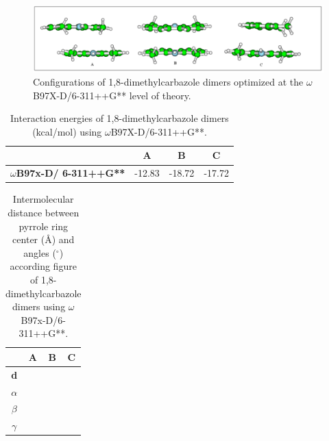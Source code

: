 	
	\begin{figure}[H]
		\centering
		\includegraphics[scale=0.9]{image/18-N}
		\caption{Configurations of 1,8-dimethylcarbazole dimers optimized at the $\omega$B97X-D/6-311++G** level of theory.}
	\end{figure}
	
	\begin{table}[H]
		\caption{Interaction energies of 1,8-dimethylcarbazole dimers (kcal/mol) using $\omega$B97X-D/6-311++G**.}
		\begin{center}
			\begin{tabular}{c c c c}
				\hline
				& \textbf{A} & \textbf{B} & \textbf{C} \\ \hline
				\textbf{$\omega$B97x-D/
					6-311++G**} & -12.83 & -18.72 & -17.72  \\ \hline
			\end{tabular}
		\end{center}
		\label{}
	\end{table}	
	
	
	\begin{table}[H]
		\caption{Intermolecular distance between pyrrole ring center (Å) and angles ($^{\circ}$) according figure  of  1,8-dimethylcarbazole dimers using $\omega$B97x-D/6-311++G**.}
		\begin{center}
			\begin{tabular}{c c c c}
				\hline
				& \multicolumn{1}{c}{\textbf{A}} & \multicolumn{1}{c}{\textbf{B}} & \multicolumn{1}{c}{\textbf{C}} \\ \hline
				\textbf{d} & \multicolumn{1}{r}{} & \multicolumn{1}{r}{} & \multicolumn{1}{r}{} \\ 
				\textbf{$\alpha$}&  & &  \\ 
				\textbf{$\beta$} & &  & \\ 
				\textbf{$\gamma$} & &  & \\ \hline
			\end{tabular}
		\end{center}
		\label{}
	\end{table}		
	
